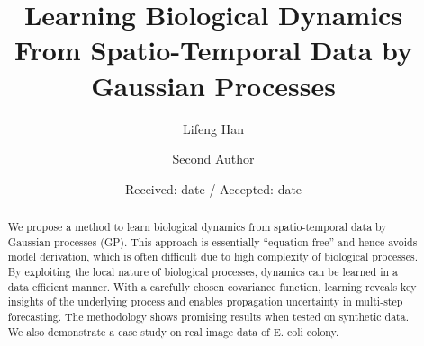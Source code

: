 \documentclass[smallextended,natbib]{svjour3}       %
\begin{document}
\title{Learning Biological Dynamics From Spatio-Temporal Data by Gaussian Processes%
}


\author{Lifeng Han         \and
        Second Author %
}



\date{Received: date / Accepted: date}


\maketitle

\begin{abstract}
We propose a method to learn biological dynamics from spatio-temporal data by Gaussian processes (GP). This approach is essentially ``equation free'' and hence avoids model derivation, which is often difficult due to high complexity of biological processes. By exploiting the local nature of biological processes, dynamics can be learned in a data efficient manner. With a carefully chosen covariance function, learning reveals key insights of the underlying process and enables propagation uncertainty in multi-step forecasting. The methodology shows promising results when tested on synthetic data. We also demonstrate a case study on real image data of E. coli colony.  
\end{abstract}
\end{document}
